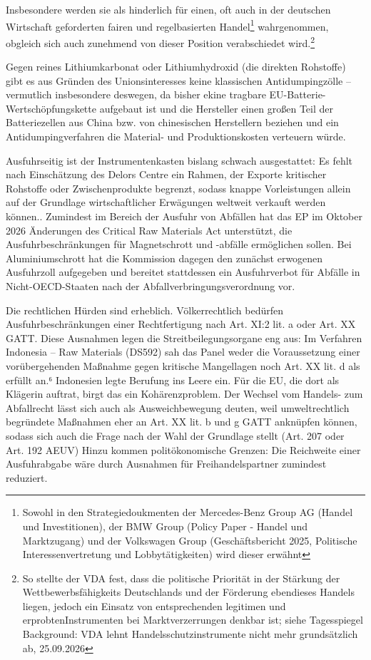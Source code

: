 \documentclass[12pt,a4paper,oneside]{book} %
\begin{document}
Insbesondere werden sie als hinderlich für einen, oft auch in der deutschen Wirtschaft geforderten fairen und regelbasierten Handel\footnote{Sowohl in den Strategiedoukmenten der Mercedes-Benz Group AG (Handel und Investitionen), der BMW Group (Policy Paper - Handel und Marktzugang) und der Volkswagen Group (Geschäftsbericht 2025, Politische Interessenvertretung und Lobbytätigkeiten) wird dieser erwähnt} wahrgenommen, obgleich sich auch zunehmend von dieser Position verabschiedet wird.\footnote{So stellte der VDA fest, dass die politische Priorität in der Stärkung der Wettbewerbsfähigkeits Deutschlands und der Förderung ebendieses Handels liegen, jedoch ein Einsatz von entsprechenden \glqq legitimen und erprobten\grqq Instrumenten bei Marktverzerrungen denkbar ist; siehe Tagesspiegel Background: VDA lehnt Handelsschutzinstrumente nicht mehr grundsätzlich ab, 25.09.2026}

Gegen reines Lithiumkarbonat oder Lithiumhydroxid (die direkten Rohstoffe) gibt es aus Gründen des Unionsinteresses keine klassischen Antidumpingzölle -- vermutlich insbesondere deswegen, da bisher ekine tragbare EU-Batterie-Wertschöpfungskette aufgebaut ist und die Hersteller einen großen Teil der Batteriezellen aus China bzw. von chinesischen Herstellern beziehen und ein Antidumpingverfahren die Material- und Produktionskosten verteuern würde.

Ausfuhrseitig ist der Instrumentenkasten bislang schwach ausgestattet: Es fehlt nach Einschätzung des Delors Centre ein Rahmen, der Exporte kritischer Rohstoffe oder Zwischenprodukte begrenzt, sodass knappe Vorleistungen allein auf der Grundlage wirtschaftlicher Erwägungen weltweit verkauft werden können..\autocite{The EU's critical raw materials predicament: ReSourceEU to the Rescue?} Zumindest im Bereich der Ausfuhr von Abfällen hat das EP im Oktober 2026 Änderungen des Critical Raw Materials Act unterstützt, die Ausfuhrbeschränkungen für Magnetschrott und -abfälle ermöglichen sollen. Bei Aluminiumschrott hat die Kommission dagegen den zunächst erwogenen Ausfuhrzoll aufgegeben und bereitet stattdessen ein Ausfuhrverbot für Abfälle in Nicht-OECD-Staaten nach der Abfallverbringungsverordnung vor.

Die rechtlichen Hürden sind erheblich. Völkerrechtlich bedürfen Ausfuhrbeschränkungen einer Rechtfertigung nach Art. XI:2 lit. a oder Art. XX GATT. Diese Ausnahmen legen die Streitbeilegungsorgane eng aus: Im Verfahren Indonesia – Raw Materials (DS592) sah das Panel weder die Voraussetzung einer vorübergehenden Maßnahme gegen kritische Mangellagen noch Art. XX lit. d als erfüllt an.⁶ Indonesien legte Berufung ins Leere ein. Für die EU, die dort als Klägerin auftrat, birgt das ein Kohärenzproblem. Der Wechsel vom Handels- zum Abfallrecht lässt sich auch als Ausweichbewegung deuten, weil umweltrechtlich begründete Maßnahmen eher an Art. XX lit. b und g GATT anknüpfen können, sodass sich auch die Frage nach der Wahl der Grundlage stellt (Art. 207 oder Art. 192 AEUV) Hinzu kommen politökonomische Grenzen: Die Reichweite einer Ausfuhrabgabe wäre durch Ausnahmen für Freihandelspartner zumindest reduziert.
\end{document}
